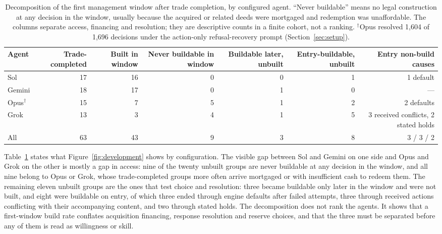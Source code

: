 \begin{table}[t]
\centering\small
\begin{tabular}{lrrrrrr}\toprule
Agent & Trade-completed & Built in window & Never buildable in window & Buildable later, unbuilt & Entry-buildable, unbuilt & Entry non-build causes\\\midrule
Sol & 17 & 16 & 0 & 0 & 1 & 1 default\\
Gemini & 18 & 17 & 0 & 1 & 0 & ---\\
Opus$^\dagger$ & 15 & 7 & 5 & 1 & 2 & 2 defaults\\
Grok & 13 & 3 & 4 & 1 & 5 & 3 received conflicts, 2 stated holds\\\midrule
All & 63 & 43 & 9 & 3 & 8 & 3 / 3 / 2\\
\bottomrule\end{tabular}
\caption{Decomposition of the first management window after trade completion, by configured agent. ``Never buildable'' means no legal construction at any decision in the window, usually because the acquired or related deeds were mortgaged and redemption was unaffordable. The columns separate access, financing and resolution; they are descriptive counts in a finite cohort, not a ranking. $^\dagger$Opus resolved 1,604 of 1,696 decisions under the action-only refusal-recovery prompt (Section~\ref{sec:setup}).}
\label{tab:first-window-decomposition}
\end{table}
Table~\ref{tab:first-window-decomposition} states what Figure~\ref{fig:development} shows by configuration. The visible gap between Sol and Gemini on one side and Opus and Grok on the other is mostly a gap in access: nine of the twenty unbuilt groups are never buildable at any decision in the window, and all nine belong to Opus or Grok, whose trade-completed groups more often arrive mortgaged or with insufficient cash to redeem them. The remaining eleven unbuilt groups are the ones that test choice and resolution: three became buildable only later in the window and were not built, and eight were buildable on entry, of which three ended through engine defaults after failed attempts, three through received actions conflicting with their accompanying content, and two through stated holds. The decomposition does not rank the agents. It shows that a first-window build rate conflates acquisition financing, response resolution and reserve choices, and that the three must be separated before any of them is read as willingness or skill.


